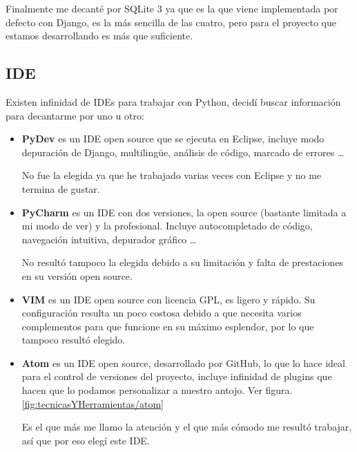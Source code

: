 Finalmente me decanté por SQLite 3 ya que es la que viene implementada por defecto con Django, es la más sencilla de las cuatro, pero para el proyecto que estamos desarrollando es más que suficiente.


\subsection{IDE}

Existen infinidad de IDEs para trabajar con Python, decidí buscar información para decantarme por uno u otro:

	\begin{itemize}
	\item \textbf{PyDev} \cite{PyDev} es un IDE open source que se ejecuta en Eclipse, incluye modo depuración de Django, multilingüe, análisis de código, marcado de errores \ldots
	
	No fue la elegida ya que he trabajado varias veces con Eclipse y no me termina de gustar.
	
	\item \textbf{PyCharm} \cite{PyCharm}  es un IDE con dos versiones, la open source (bastante limitada a mi modo de ver) y la profesional. 
	Incluye autocompletado de código, navegación intuitiva, depurador gráfico \ldots
	
	No resultó tampoco la elegida debido a su limitación y falta de prestaciones en su versión open source.
	
	\item \textbf{VIM} \cite{VIM} es un IDE open source con licencia GPL, es ligero y rápido. Su configuración resulta un poco costosa debido a que necesita varios complementos para que funcione en su máximo esplendor, por lo que tampoco resultó elegido. 

	\item \textbf{Atom} \cite{Atom} es un IDE open source, desarrollado por GitHub, lo que lo hace ideal para el control de versiones del proyecto, incluye infinidad de plugins que hacen que lo podamos personalizar a nuestro antojo. Ver figura. \ref{fig:tecnicasYHerramientas/atom}
	
	Es el que más me llamo la atención y el que más cómodo me resultó trabajar, así que por eso elegí este IDE.
	
	\end{itemize}

\newpage
